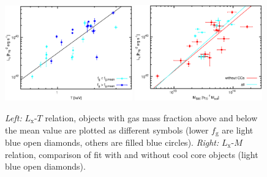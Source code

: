 \documentclass[structabstract]{aa}
\begin{document}
\begin{figure}
  \centering
  \includegraphics[width=0.49\textwidth]{lthdafg_c.eps}
  \includegraphics[width=0.49\textwidth]{lmhdacc_c.eps}\quad
  \caption{\emph{Left:} $L_{\text{x}}$-$T$ relation, objects with gas
    mass fraction above and below the mean value are plotted as
    different symbols (lower $f_{\text{g}}$ are light blue open
    diamonds, others are filled blue circles). \emph{Right:}
    $L_{\text{x}}$-$M$ relation, comparison of fit with and without
    cool core objects (light blue open diamonds).}
  \label{fig:ccfgrelation}%
\end{figure}
\end{document}

